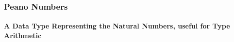 \begin{frame}[fragile]
\frametitle{Peano Numbers}
\framesubtitle{A Data Type Representing the Natural Numbers, useful for Type Arithmetic}

\begin{definition}
  
\end{definition}

\begin{example}
  
\end{example}

\begin{exercise}
  
\end{exercise}

\end{frame}
